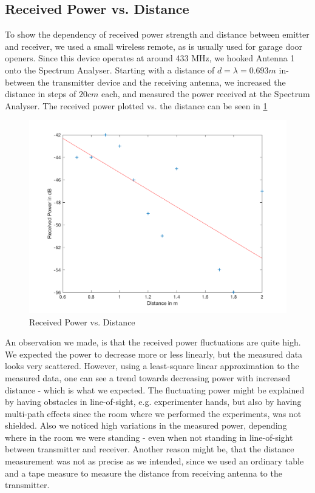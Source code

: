 \subsection{Received Power vs. Distance}
To show the dependency of received power strength and distance between emitter and receiver, we used a small wireless remote, as is usually used for garage door openers. Since this device operates at around 433 MHz, we hooked Antenna 1 onto the Spectrum Analyser. Starting with a distance of $d=\lambda=0.693m$ in-between the transmitter device and the receiving antenna, we increased the distance in steps of $20cm$ each, and measured the power received at the Spectrum Analyser.
The received power plotted vs. the distance can be seen in \cref{fig:omni}
\begin{figure}[h!]
	\centering
	\includegraphics[width=\textwidth/2+5em]{images/omnidir.png}
	\caption{Received Power vs. Distance}
	\label{fig:omni}
\end{figure}
An observation we made, is that the received power fluctuations are quite high. We expected the power to decrease more or less linearly, but the measured data looks very scattered. However, using a least-square linear approximation to the measured data, one can see a trend towards decreasing power with increased distance - which is what we expected.
The fluctuating power might be explained by having obstacles in line-of-sight, e.g. experimenter hands, but also by having multi-path effects since the room where we performed the experiments, was not shielded. Also we noticed high variations in the measured power, depending where in the room we were standing - even when not standing in line-of-sight between transmitter and receiver.
Another reason might be, that the distance measurement was not as precise as we intended, since we used an ordinary table and a tape measure to measure the distance from receiving antenna to the transmitter.




